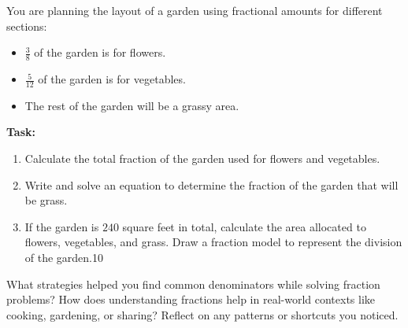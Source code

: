 \documentclass[12pt]{article}
\begin{document}
\begin{tcolorbox}[colframe=black!60, colback=white, 
coltitle=black, colbacktitle=black!15, fonttitle=\bfseries\Large, 
title=Performance Task: Planning a Garden, halign title=center, left=10pt, right=10pt, top=10pt, bottom=50pt]
You are planning the layout of a garden using fractional amounts for different sections:
\begin{itemize}
    \item \( \frac{3}{8} \) of the garden is for flowers.
    \item \( \frac{5}{12} \) of the garden is for vegetables.
    \item The rest of the garden will be a grassy area.
\end{itemize}
\textbf{Task:}
\begin{enumerate}[itemsep=4em]
    \item Calculate the total fraction of the garden used for flowers and vegetables.
    \item Write and solve an equation to determine the fraction of the garden that will be grass.
    \item If the garden is \( 240 \) square feet in total, calculate the area allocated to flowers, vegetables, and grass. Draw a fraction model to represent the division of the garden.10
\vspace{1cm}
\end{enumerate}
\end{tcolorbox}

\begin{tcolorbox}[colframe=black!60, colback=white, 
coltitle=black, colbacktitle=black!15, fonttitle=\bfseries\Large, 
title=Reflection, halign title=center, left=10pt, right=10pt, top=10pt, bottom=80pt]
What strategies helped you find common denominators while solving fraction problems? How does understanding fractions help in real-world contexts like cooking, gardening, or sharing? Reflect on any patterns or shortcuts you noticed.
\end{tcolorbox}
\end{document}
